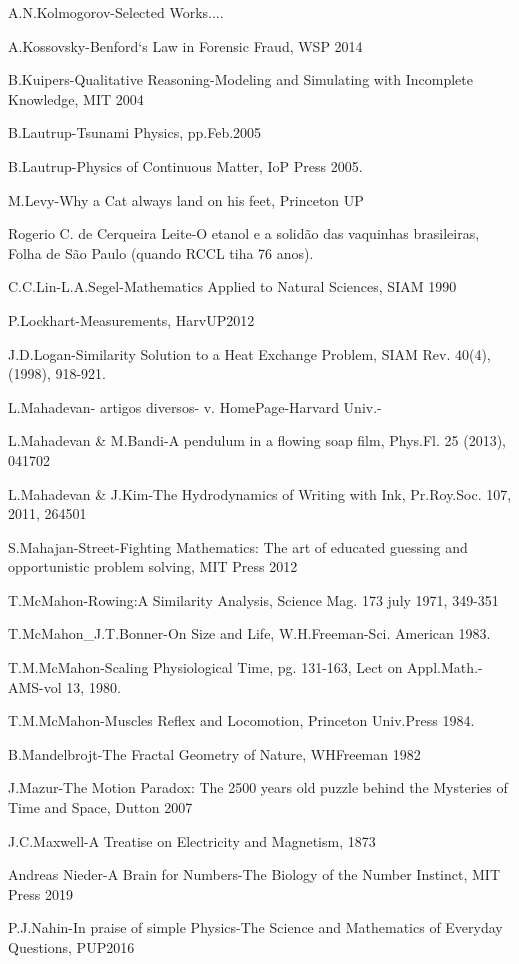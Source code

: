A.N.Kolmogorov-Selected Works....

A.Kossovsky-Benford‘s Law in Forensic Fraud, WSP 2014

B.Kuipers-Qualitative Reasoning-Modeling and Simulating with Incomplete Knowledge, MIT 2004

B.Lautrup-Tsunami Physics, pp.Feb.2005

B.Lautrup-Physics of Continuous Matter, IoP Press 2005.

M.Levy-Why a Cat always land on his feet, Princeton UP

Rogerio C. de Cerqueira Leite-O etanol e a solidão das vaquinhas brasileiras, Folha de São Paulo (quando RCCL tiha 76 anos).

C.C.Lin-L.A.Segel-Mathematics Applied to Natural Sciences, SIAM 1990

P.Lockhart-Measurements, HarvUP2012

J.D.Logan-Similarity Solution to a Heat Exchange Problem, SIAM Rev. 40(4), (1998), 918-921.

L.Mahadevan- artigos diversos- v. HomePage-Harvard Univ.-

L.Mahadevan \& M.Bandi-A pendulum in a flowing soap film, Phys.Fl. 25 (2013), 041702

L.Mahadevan \& J.Kim-The Hydrodynamics of Writing with Ink, Pr.Roy.Soc. 107, 2011, 264501

S.Mahajan-Street-Fighting Mathematics: The art of educated guessing and opportunistic problem solving, MIT Press 2012

T.McMahon-Rowing:A Similarity Analysis, Science Mag. 173 july 1971, 349-351

T.McMahon\_J.T.Bonner-On Size and Life, W.H.Freeman-Sci. American 1983.

T.M.McMahon-Scaling Physiological Time, pg. 131-163, Lect on Appl.Math.-AMS-vol 13, 1980.

T.M.McMahon-Muscles Reflex and Locomotion, Princeton Univ.Press 1984.

B.Mandelbrojt-The Fractal Geometry of Nature, WHFreeman 1982

J.Mazur-The Motion Paradox: The 2500 years old puzzle behind the Mysteries of Time and Space, Dutton 2007

J.C.Maxwell-A Treatise on Electricity and Magnetism, 1873

Andreas Nieder-A Brain for Numbers-The Biology of the Number Instinct, MIT Press 2019

P.J.Nahin-In praise of simple Physics-The Science and Mathematics of Everyday Questions, PUP2016

